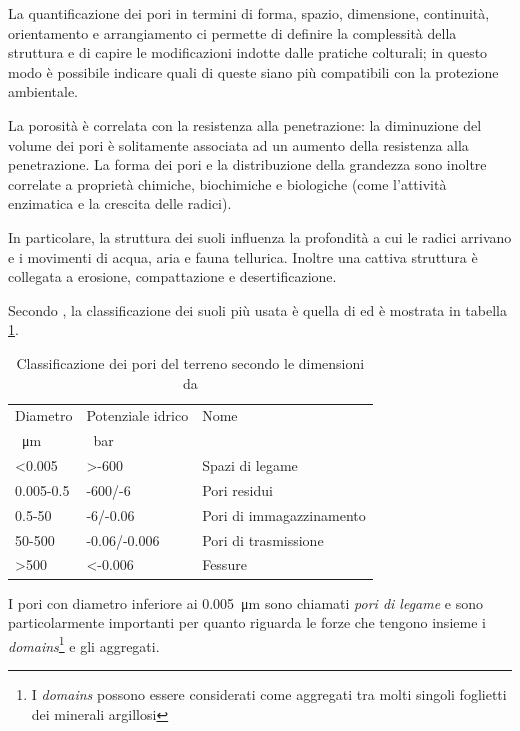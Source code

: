 \documentclass[11pt, a4paper, openright, titlepage, final, language = italian]{book}
\begin{document}
La quantificazione dei pori in termini di forma, spazio, dimensione,
continuit\`a, orientamento e arrangiamento ci permette di definire la
complessit\`a della struttura e di capire le modificazioni indotte dalle
pratiche colturali; in questo modo è possibile indicare quali di
queste siano più compatibili con la protezione ambientale.

La porosit\`a è correlata con la resistenza alla penetrazione: la
diminuzione del volume dei pori è solitamente associata ad un aumento
della resistenza alla penetrazione. La forma dei pori e la
distribuzione della grandezza sono inoltre correlate a propriet\`a
chimiche, biochimiche e biologiche (come l'attivit\`a enzimatica e la
crescita delle radici).

In particolare, la struttura dei suoli influenza la profondit\`a a cui
le radici arrivano e i movimenti di acqua, aria e fauna tellurica.
Inoltre una cattiva struttura è collegata a erosione, compattazione e
desertificazione.

Secondo \citet{pagliai2002soil}, la classificazione dei suoli più
usata è quella di \citet{greenland1977soil} ed \`e mostrata in tabella
\ref{tab:green}.

\begin{table}[ht]
  \caption{Classificazione dei pori del terreno secondo le dimensioni
    da \citet{pagliai2002soil}}
  \label{tab:green}
  \centering
  \begin{tabular}{lll}
    \toprule
    Diametro  & Potenziale idrico & Nome\\
    \SI{}{\micro\metre}  & \SI{}{\bar} & \\
    \midrule
    <0.005    & >-600        & Spazi di legame\\
    0.005-0.5 & -600/-6      & Pori residui\\
    0.5-50    & -6/-0.06     & Pori di immagazzinamento\\
    50-500    & -0.06/-0.006 & Pori di trasmissione\\
    >500      & <-0.006      & Fessure\\
    \bottomrule
  \end{tabular}
\end{table}

I pori con diametro inferiore ai \SI{0.005}{\micro\meter} sono
chiamati \textit{pori di legame} e sono particolarmente importanti per
quanto riguarda le forze che tengono insieme i
\emph{domains}\footnote{I \emph{domains} possono essere considerati
  come aggregati tra molti singoli foglietti dei minerali argillosi} e
gli aggregati.
\end{document}

